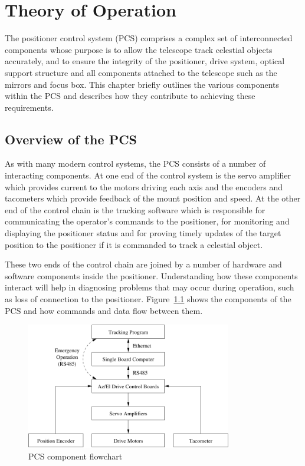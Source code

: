 \documentclass[letterpaper,12pt]{report}
\begin{document}
\chapter{Theory of Operation}
\label{CHAP::NORMAL}
\thispagestyle{fancy}

The positioner control system (PCS) comprises a complex set of
interconnected components whose purpose is to allow the telescope
track celestial objects accurately, and to ensure the integrity of the
positioner, drive system, optical support structure and all components
attached to the telescope such as the mirrors and focus box. This
chapter briefly outlines the various components within the PCS and
describes how they contribute to achieving these requirements.

\section{Overview of the PCS}

As with many modern control systems, the PCS consists of a number of
interacting components. At one end of the control system is the servo
amplifier which provides current to the motors driving each axis and
the encoders and tacometers which provide feedback of the mount
position and speed. At the other end of the control chain is the
tracking software which is responsible for communicating the
operator's commands to the positioner, for monitoring and displaying
the positioner status and for proving timely updates of the target
position to the positioner if it is commanded to track a celestial
object.

These two ends of the control chain are joined by a number of hardware
and software components inside the positioner. Understanding how these
components interact will help in diagnosing problems that may occur
during operation, such as loss of connection to the positioner.
Figure~\ref{FIG::PCS} shows the components of the PCS and how commands
and data flow between them.

\begin{figure}
\centerline{\includegraphics[width=0.8\textwidth]{graphics/pcs_components.pdf}}
\caption{\label{FIG::PCS}PCS component flowchart}
\end{figure}
\end{document}
